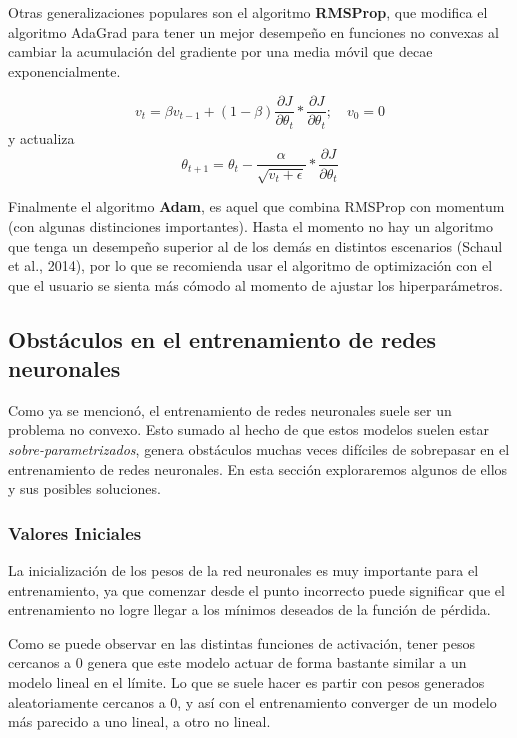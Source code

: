 Otras generalizaciones populares son el algoritmo \textbf{RMSProp}, que modifica el algoritmo AdaGrad para tener un mejor desempe{\~{n}}o en funciones no convexas al cambiar la acumulaci\'on del gradiente por una media m\'ovil que decae exponencialmente.

\[
v_t = \beta v_{t-1} + (1-\beta)\frac{\partial J}{\partial \theta_t} * \frac{\partial J}{\partial \theta_t} ; \quad v_0 = 0
\] 
y actualiza 
\[
\theta_{t+1} = \theta_t - \frac{\alpha}{\sqrt{v_t + \epsilon}} * \frac{\partial J}{\partial \theta_t}
\] 


Finalmente  el algoritmo \textbf{Adam}, es aquel que combina RMSProp con momentum (con algunas distinciones importantes). Hasta el momento no hay un algoritmo que tenga un desempe{\~{n}}o superior al de los dem\'as en distintos escenarios (Schaul et al., 2014), por lo que se recomienda usar el algoritmo de optimizaci\'on con el que el usuario se sienta m\'as c\'omodo al momento de ajustar los hiperpar\'ametros.

\subsection{Obstáculos en el entrenamiento de redes neuronales}

Como ya se mencionó, el entrenamiento de redes neuronales suele ser un problema no convexo. Esto sumado al hecho de que estos modelos suelen estar \textit{sobre-parametrizados}, genera obstáculos muchas veces difíciles de sobrepasar en el entrenamiento de redes neuronales. En esta sección exploraremos algunos de ellos y sus posibles soluciones. 

\subsubsection{Valores Iniciales}

La inicialización de los pesos de la red neuronales es muy importante para el entrenamiento, ya que comenzar desde el punto incorrecto puede significar que el entrenamiento no logre llegar a los mínimos deseados de la función de pérdida. 

Como se puede observar en las distintas funciones de activación, tener pesos cercanos a $0$ genera que este modelo actuar de forma bastante similar a un modelo lineal en el límite. Lo que se suele hacer es partir con pesos generados aleatoriamente cercanos a $0$, y así con el entrenamiento converger de un modelo más parecido a uno lineal, a otro no lineal. 

